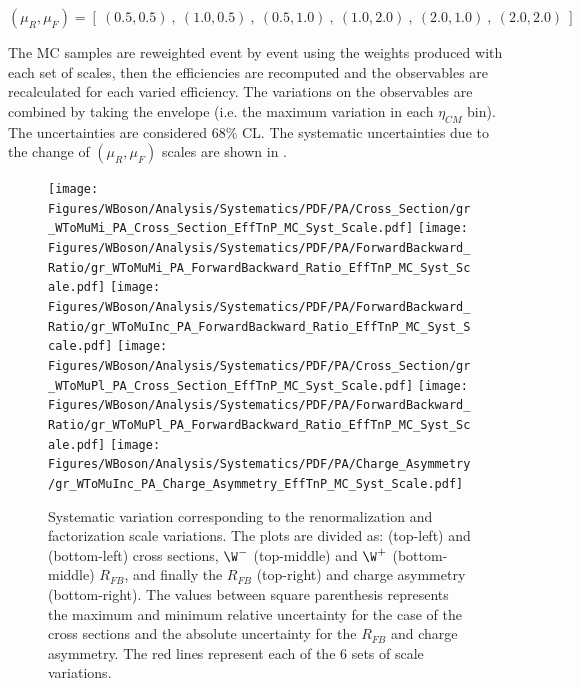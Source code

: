 \begin{equation*}
(\mu_{R} , \mu_{F}) = [\ (0.5 , 0.5)\ ,\ (1.0 , 0.5)\ ,\ (0.5 , 1.0)\ ,\ (1.0 , 2.0)\ ,\ (2.0 , 1.0)\ ,\ (2.0 , 2.0)\ ]
\end{equation*}

The MC samples are reweighted event by event using the \POWHEG weights produced with each set of scales, then the efficiencies are recomputed and the observables are recalculated for each varied efficiency. The variations on the observables are combined by taking the envelope (i.e. the maximum variation in each $\eta_{CM}$ bin). The uncertainties are considered 68$\%$ CL. The systematic uncertainties due to the change of $(\mu_{R} , \mu_{F})$ scales are shown in .

\begin{figure}[!htbp]
 \begin{center}
  \texttt{[image: Figures/WBoson/Analysis/Systematics/PDF/PA/Cross\_Section/gr\_WToMuMi\_PA\_Cross\_Section\_EffTnP\_MC\_Syst\_Scale.pdf]}
  \texttt{[image: Figures/WBoson/Analysis/Systematics/PDF/PA/ForwardBackward\_Ratio/gr\_WToMuMi\_PA\_ForwardBackward\_Ratio\_EffTnP\_MC\_Syst\_Scale.pdf]}
  \texttt{[image: Figures/WBoson/Analysis/Systematics/PDF/PA/ForwardBackward\_Ratio/gr\_WToMuInc\_PA\_ForwardBackward\_Ratio\_EffTnP\_MC\_Syst\_Scale.pdf]}
  \texttt{[image: Figures/WBoson/Analysis/Systematics/PDF/PA/Cross\_Section/gr\_WToMuPl\_PA\_Cross\_Section\_EffTnP\_MC\_Syst\_Scale.pdf]}
  \texttt{[image: Figures/WBoson/Analysis/Systematics/PDF/PA/ForwardBackward\_Ratio/gr\_WToMuPl\_PA\_ForwardBackward\_Ratio\_EffTnP\_MC\_Syst\_Scale.pdf]}
  \texttt{[image: Figures/WBoson/Analysis/Systematics/PDF/PA/Charge\_Asymmetry/gr\_WToMuInc\_PA\_Charge\_Asymmetry\_EffTnP\_MC\_Syst\_Scale.pdf]}
 \end{center}
 \caption{Systematic variation corresponding to the renormalization and factorization scale variations. The plots are divided as: \WToMuNuMi (top-left) and \WToMuNuPl (bottom-left) cross sections, $\W^{-}$ (top-middle) and $\W^{+}$ (bottom-middle) $R_{FB}$, and finally the \W $R_{FB}$ (top-right) and \W charge asymmetry (bottom-right). The values between square parenthesis represents the maximum and minimum relative uncertainty for the case of the cross sections and the absolute uncertainty for the $R_{FB}$ and charge asymmetry. The red lines represent each of the 6 sets of scale variations. }
 \label{fig:Systematic_MC_Syst_Scale}
\end{figure}

